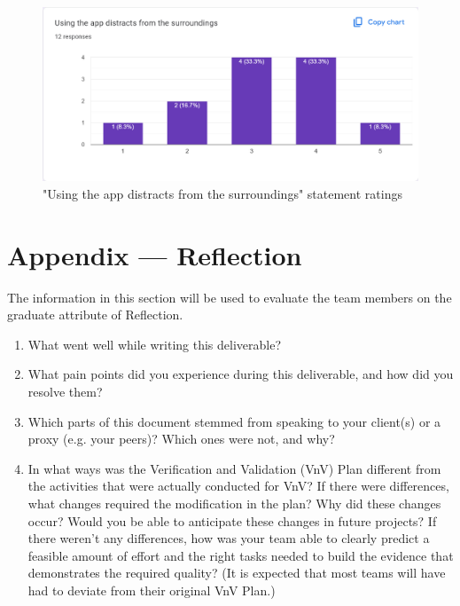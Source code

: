 \documentclass[12pt, titlepage]{article}
\begin{document}
\begin{figure}[htbp]
  \caption{"Using the app distracts from the surroundings" statement ratings}
  \centerline{\includegraphics[scale=0.35]{./Images/Q7.png}}
  \label{fig:Enjoy}
\end{figure}

\newpage{}

\section*{Appendix --- Reflection}

The information in this section will be used to evaluate the team members on the
graduate attribute of Reflection.



\begin{enumerate}
  \item What went well while writing this deliverable?
  \item What pain points did you experience during this deliverable, and how
        did you resolve them?
  \item Which parts of this document stemmed from speaking to your client(s) or
        a proxy (e.g. your peers)? Which ones were not, and why?
  \item In what ways was the Verification and Validation (VnV) Plan different
        from the activities that were actually conducted for VnV?  If there were
        differences, what changes required the modification in the plan?  Why did
        these changes occur?  Would you be able to anticipate these changes in future
        projects?  If there weren't any differences, how was your team able to clearly
        predict a feasible amount of effort and the right tasks needed to build the
        evidence that demonstrates the required quality?  (It is expected that most
        teams will have had to deviate from their original VnV Plan.)
\end{enumerate}
\end{document}
